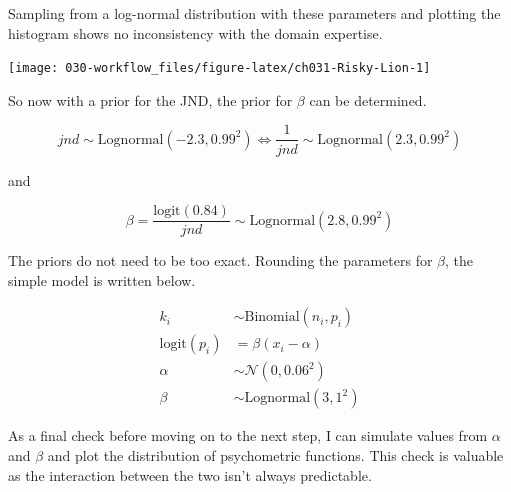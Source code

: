 \documentclass[11pt, oneside, openany]{scrbook}
\newenvironment{Shaded}{\begin{snugshade}}{\end{snugshade}}
\newcommand{\CommentTok}[1]{\textcolor[rgb]{0.56,0.35,0.01}{\textit{#1}}}
\newcommand{\DataTypeTok}[1]{\textcolor[rgb]{0.13,0.29,0.53}{#1}}
\newcommand{\DecValTok}[1]{\textcolor[rgb]{0.00,0.00,0.81}{#1}}
\newcommand{\KeywordTok}[1]{\textcolor[rgb]{0.13,0.29,0.53}{\textbf{#1}}}
\newcommand{\NormalTok}[1]{#1}
\newcommand{\OperatorTok}[1]{\textcolor[rgb]{0.81,0.36,0.00}{\textbf{#1}}}
\newcommand{\StringTok}[1]{\textcolor[rgb]{0.31,0.60,0.02}{#1}}
\begin{document}
\begin{Shaded}
\end{Shaded}

Sampling from a log-normal distribution with these parameters and plotting the histogram shows no inconsistency with the domain expertise.

\begin{center}\texttt{[image: 030-workflow\_files/figure-latex/ch031-Risky-Lion-1]} \end{center}

So now with a prior for the JND, the prior for \(\beta\) can be determined.

\[
jnd \sim \mathrm{Lognormal}(-2.3, 0.99^2) \Longleftrightarrow \frac{1}{jnd} \sim \mathrm{Lognormal}(2.3, 0.99^2)
\]

and

\[
\beta = \frac{\mathrm{logit}(0.84)}{jnd} \sim \mathrm{Lognormal}(2.8, 0.99^2)
\]

The priors do not need to be too exact. Rounding the parameters for \(\beta\), the simple model is written below.

\begin{align*}
  k_i &\sim \mathrm{Binomial}(n_i, p_i) \\
  \mathrm{logit}(p_i) &= \beta ( x_i - \alpha ) \\
  \alpha &\sim \mathcal{N}(0, 0.06^2) \\
  \beta &\sim \mathrm{Lognormal}(3, 1^2)
\end{align*}

As a final check before moving on to the next step, I can simulate values from \(\alpha\) and \(\beta\) and plot the distribution of psychometric functions. This check is valuable as the interaction between the two isn't always predictable.
\end{document}
